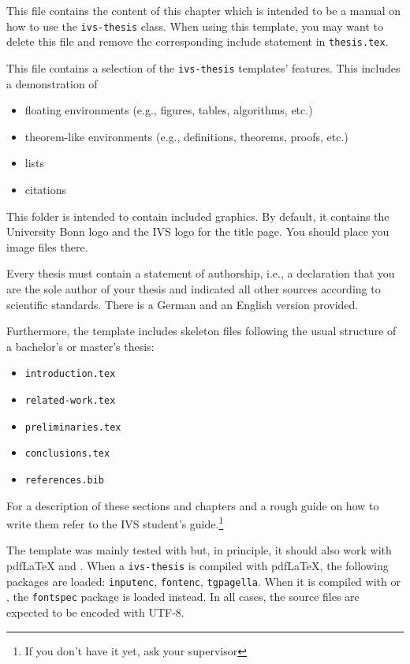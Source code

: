 \begin{description}[font=\normalfont\ttfamily]
	\item[setup.tex] This file contains the content of this chapter which is intended to be a manual on how to use the \texttt{ivs-thesis} class. When using this template, you may want to delete this file and remove the corresponding include statement in \texttt{thesis.tex}. 
	\item[feature-reel.tex] This file contains a selection of the \texttt{ivs-thesis} templates' features. This includes a demonstration of 
	\begin{itemize} 
		\item floating environments (e.g., figures, tables, algorithms, etc.) 
		\item theorem-like environments (e.g., definitions, theorems, proofs, etc.) 
		\item lists
		\item citations 
	\end{itemize}
	\item[gfx/*] This folder is intended to contain included graphics. By default, it contains the University Bonn logo and the IVS logo for the title page. You should place you image files there. 
	\item[authorship-*.tex] Every thesis must contain a statement of authorship, i.e., a declaration that you are the sole author of your thesis and indicated all other sources according to scientific standards. There is a German and an English version provided. 
\end{description}

Furthermore, the template includes skeleton files following the usual structure 
of a bachelor's or master's thesis: 
\begin{itemize}
	\item \texttt{introduction.tex}
	\item \texttt{related-work.tex}
	\item \texttt{preliminaries.tex}
	\item \texttt{conclusions.tex}
	\item \texttt{references.bib}
\end{itemize}
For a description of these sections and chapters and a rough guide on how to write them refer to the IVS student's guide.\footnote{If you don't have it yet, ask your supervisor} %

The template was mainly tested with \LuaLaTeX{} but, in principle, it should also work with {pdf\LaTeX{}} and \XeLaTeX{}. When a \texttt{ivs-thesis} is compiled with pdf\LaTeX{}, the following packages are loaded: \texttt{inputenc}, \texttt{fontenc}, \texttt{tgpagella}. When it is compiled with \LuaLaTeX{} or \XeLaTeX{}, the \texttt{fontspec} package is loaded instead. In all cases, the source files are expected to be encoded with UTF-8. 

